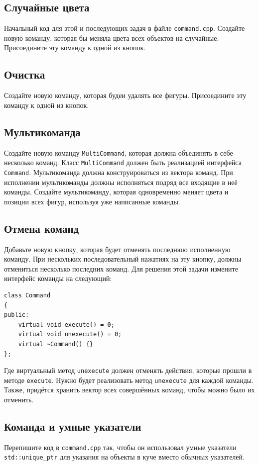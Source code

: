 \documentclass{article}
\begin{document}
\subsection{Случайные цвета}
Начальный код для этой и последующих задач в файле \texttt{command.cpp}. Создайте новую команду, которая бы меняла цвета всех объектов на случайные. Присоедините эту команду к одной из кнопок.

\subsection{Очистка}
Создайте новую команду, которая будеи удалять все фигуры. Присоедините эту команду к одной из кнопок.
        
\subsection{Мультикоманда}
Создайте новую команду \texttt{MultiCommand}, которая должна объединять в себе несколько команд. Класс \texttt{MultiCommand} должен быть реализацией интерфейса \texttt{Command}. Мультикоманда должна конструироваться из вектора команд. При исполнении мультикоманды должны исполняться подряд все входящие в неё команды. Создайте мультикоманду, которая одновременно меняет цвета и позиции всех фигур, используя уже написанные команды.


\subsection{Отмена команд}
Добавьте новую кнопку, которая будет отменять последнюю исполненную команду.
При нескольких последовательный нажатиях на эту кнопку, должны отмениться несколько последних команд.
Для решения этой задачи измените интерфейс команды на следующий:
\begin{lstlisting}
class Command
{
public:
    virtual void execute() = 0;
    virtual void unexecute() = 0;
    virtual ~Command() {}
};
\end{lstlisting}
Где виртуальный метод \texttt{unexecute} должен отменять действия, которые прошли в методе \texttt{execute}. Нужно будет реализовать метод \texttt{unexecute} для каждой команды. Также, придётся хранить вектор всех совершённых команд, чтобы можно было их отменить.


\subsection{Команда и умные указатели}
Перепишите код в \texttt{command.cpp} так, чтобы он использовал умные указатели \texttt{std::unique\_ptr} для указания на объекты в куче вместо обычных указателей.
\end{document}
